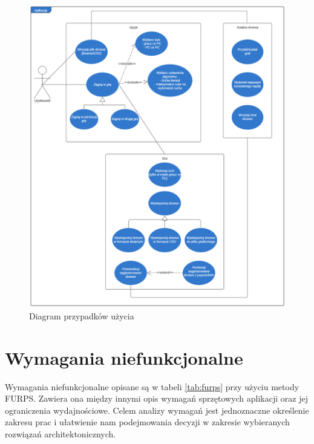 \documentclass{article}
\let\oldsection\section
\renewcommand\section{\clearpage\oldsection}
\begin{document}
	\begin{figure}[h!]
		\centering
		\includegraphics[width=\textwidth, trim={0 6.5cm 0 0},clip]{aplikacja-use-case-eps}
		\caption{Diagram przypadków użycia}
		\label{rys:usecase}
	\end{figure}
	
	\section{Wymagania niefunkcjonalne}
	Wymagania niefunkcjonalne opisane są w tabeli \ref{tab:furps} przy użyciu metody FURPS. Zawiera ona między innymi opis wymagań sprzętowych aplikacji oraz jej ograniczenia wydajnościowe. Celem analizy wymagań jest jednoznaczne określenie zakresu prac i ułatwienie nam podejmowania decyzji w zakresie wybieranych rozwiązań architektonicznych.
\end{document}
